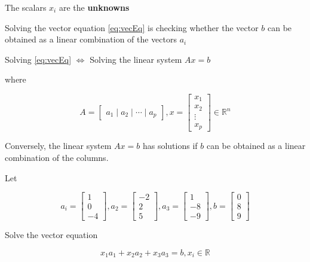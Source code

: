 The scalars $x_i$ are the \textbf{unknowns}


\begin{remark}
	Solving the vector equation \cref*{eq:vecEq} is checking whether the vector $b$ can be obtained as a linear combination of the vectors $a_i$
\end{remark}

\begin{remark}
	Solving \cref*{eq:vecEq} $\iff$ Solving the linear system $Ax=b$

	where

	\begin{equation} \label{eq:lc-equiv-sys}
		A = \begin{bmatrix}
			a_1 \mid a_2 \mid \cdots \mid a_p
		\end{bmatrix}, x = \begin{bmatrix}
			x_1\\
			x_2\\
			\vdots\\
			x_p
		\end{bmatrix} \in \mathbb{R}^n
	\end{equation}

	Conversely, the linear system $Ax = b$ has solutions if $b$ can be obtained as a linear combination of the columns.
\end{remark}

\begin{example}
	Let

	\begin{equation} \label{eq:ex-lc-sys}
		a_i = \begin{bmatrix}
			1\\0\\-4
		\end{bmatrix}, a_2=\begin{bmatrix}
			-2\\2\\5
		\end{bmatrix}, a_3=\begin{bmatrix}
			1\\-8\\-9
		\end{bmatrix}, b=\begin{bmatrix}
			0\\8\\9
		\end{bmatrix}
	\end{equation}

	Solve the vector equation
	
	\begin{equation} \label{eq:ex-lc-sys-eq}
		x_1 a_1 + x_2 a_2 + x_3 a_3 = b, x_i \in \mathbb{R}
	\end{equation}
\end{example}


